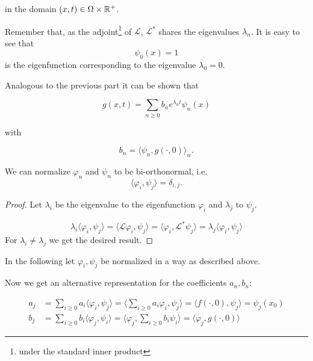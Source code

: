 in the domain $(x,t)\in \Omega\times\mathbb{R}^+$.

Remember that, as the adjoint\footnote{under the standard inner product} of $\mathcal{L}$, $\mathcal{L}^*$ shares the eigenvalues $\lambda_n$. It is easy to see that
\begin{equation}\label{eq:firstEigenfunctionConstant}
\psi_0(x)=1
\end{equation}
is the eigenfunction corresponding to the eigenvalue $\lambda_0 = 0$.

Analogous to the previous part it can be shown that

\begin{equation*}
g(x,t) = \sum_{n\geq 0} b_n e^{\lambda_n t}\psi_n(x)
\end{equation*}

with 

\begin{equation*}
b_n = \langle \psi_n, g(\cdot, 0) \rangle_w.
\end{equation*}

\begin{lemma}
We can normalize $\varphi_n$ and $\psi_n$ to be bi-orthonormal, i.e.
\begin{equation}\label{eq:biorthonormality}
\langle \varphi_i, \psi_j \rangle = \delta_{i,j}.
\end{equation}
\end{lemma}

\begin{proof}
Let $\lambda_i$ be the eigenvalue to the eigenfunction $\varphi_i$ and $\lambda_j$ to $\psi_j$.

\begin{equation*}
\lambda_i \langle \varphi_i, \psi_j \rangle =
\langle \mathcal{L}\varphi_i, \psi_j \rangle =
\langle \varphi_i, \mathcal{L}^*\psi_j \rangle =
\lambda_j \langle \varphi_i, \psi_j \rangle
\end{equation*}
For $\lambda_i \neq \lambda_j$ we get the desired result.
\end{proof}

In the following let $\varphi_i, \psi_j$ be normalized in a way as described above.

Now we get an alternative representation for the coefficients $a_n, b_n$:

\begin{equation}\label{eq:alternativeReprForCoefficients}\begin{aligned}
a_j&= \sum_{i\geq 0} a_i \langle \varphi_i, \psi_j \rangle
    = \langle \sum_{i\geq 0} a_i \varphi_i, \psi_j \rangle
    = \langle f(\cdot, 0), \psi_j \rangle = \psi_j(x_0)\\
b_j&= \sum_{i\geq 0} b_i \langle \varphi_j, \psi_i \rangle
    = \langle \varphi_j, \sum_{i\geq 0} b_i \psi_i \rangle
    = \langle \varphi_j, g(\cdot, 0) \rangle
\end{aligned}\end{equation}

